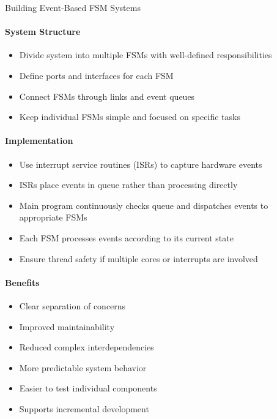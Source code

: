 \begin{KR}{Building Event-Based FSM Systems}
\paragraph{System Structure}
\begin{itemize}
    \item Divide system into multiple FSMs with well-defined responsibilities
    \item Define ports and interfaces for each FSM
    \item Connect FSMs through links and event queues
    \item Keep individual FSMs simple and focused on specific tasks
\end{itemize}

\paragraph{Implementation}
\begin{itemize}
    \item Use interrupt service routines (ISRs) to capture hardware events
    \item ISRs place events in queue rather than processing directly
    \item Main program continuously checks queue and dispatches events to appropriate FSMs
    \item Each FSM processes events according to its current state
    \item Ensure thread safety if multiple cores or interrupts are involved
\end{itemize}

\paragraph{Benefits}
\begin{itemize}
    \item Clear separation of concerns
    \item Improved maintainability
    \item Reduced complex interdependencies
    \item More predictable system behavior
    \item Easier to test individual components
    \item Supports incremental development
\end{itemize}
\end{KR}




